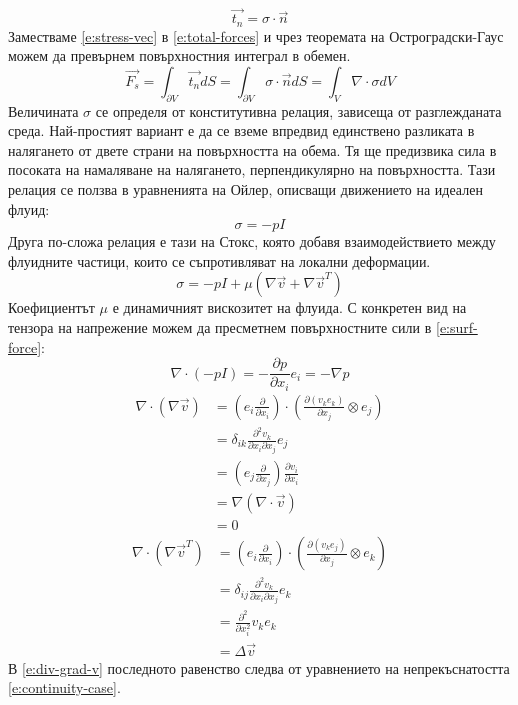 \documentclass[12pt]{article}
\numberwithin{equation}{section}
\begin{document}
\begin{equation}
    \label{e:stress-vec}
    \vec{t_n}=\sigma\cdot\vec{n}
\end{equation}
Заместваме \autoref{e:stress-vec} в \autoref{e:total-forces} и чрез теоремата на Остроградски-Гаус можем да превърнем повърхностния интеграл в обемен.
\begin{equation}
    \label{e:surf-force}
    \vec{F_s} = \int_{\partial V} \vec{t_n}dS
    = \int_{\partial V} \sigma\cdot\vec{n}dS
    = \int_V \nabla\cdot\sigma dV
\end{equation}
Величината $\sigma$ се определя от конститутивна релация, зависеща от разглежданата среда. Най-простият вариант е да се вземе впредвид единствено разликата в налягането от двете страни на повърхността на обема. Тя ще предизвика сила в посоката на намаляване на налягането, перпендикулярно на повърхността. Тази релация се ползва в уравненията на Ойлер, описващи движението на идеален флуид:
\begin{equation}
    \sigma=-pI
\end{equation}
Друга по-сложа релация е тази на Стокс, която добавя взаимодействието между флуидните частици, които се съпротивляват на локални деформации.
\begin{equation}
    \sigma=-pI + \mu(\nabla\vec{v}+\nabla\vec{v}^T)
\end{equation}
Коефициентът $\mu$ е динамичният вискозитет на флуида. С конкретен вид на тензора на напрежение можем да пресметнем повърхностните сили в \autoref{e:surf-force}:
\begin{equation}
    \nabla\cdot(-pI)=-\frac{\partial p}{\partial x_i}e_i=-\nabla p
\end{equation}
\begin{equation}
    \label{e:div-grad-v}
    \begin{aligned}
        \nabla\cdot(\nabla\vec{v})&=\left(e_i\frac{\partial}{\partial x_i}\right)\cdot\left(\frac{\partial(v_k e_k)}{\partial x_j}\otimes e_j\right) \\
        &=\delta_{ik}\frac{\partial^2 v_k}{\partial x_i \partial x_j}e_j \\
        &=\left(e_j\frac{\partial}{\partial x_j}\right)\frac{\partial v_i}{\partial x_i} \\
        &=\nabla(\nabla\cdot\vec{v}) \\
        &=0
    \end{aligned}
\end{equation}
\begin{equation}
    \begin{aligned}
        \nabla\cdot(\nabla\vec{v}^T)&=\left(e_i\frac{\partial}{\partial x_i}\right)\cdot\left(\frac{\partial(v_k e_j)}{\partial x_j}\otimes e_k\right) \\
        &=\delta_{ij}\frac{\partial^2 v_k}{\partial x_i \partial x_j}e_k \\
        &=\frac{\partial^2}{\partial x_i^2} v_k e_k \\
        &=\Delta\vec{v}
    \end{aligned}
\end{equation}
В \autoref{e:div-grad-v} последното равенство следва от уравнението на непрекъснатостта \autoref{e:continuity-case}. 
\end{document}
